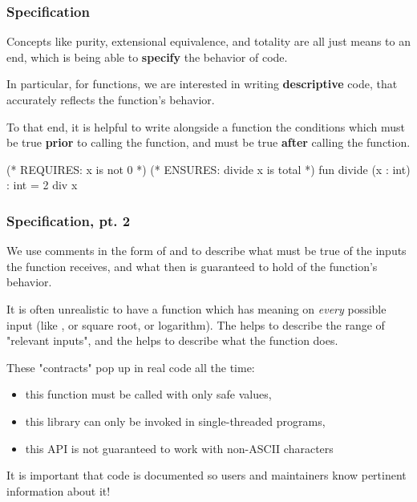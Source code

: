 \documentclass[aspectratio=169]{beamer}
\begin{document}
\begin{frame}[fragile]
  \frametitle{Specification}

  Concepts like purity, extensional equivalence, and totality are all just means to
  an end, which is being able to \textbf{specify} the behavior of code.

  \vspace{\fill}

  In particular, for functions, we are interested in writing \textbf{descriptive} code,
  that accurately reflects the function's behavior.
  
  \vspace{5pt}

  To that end, it is helpful to write alongside a function the conditions which 
  must be true \textbf{prior} to calling the function, and must be true \textbf{after}
  calling the function.

  \vspace{\fill}

  \begin{codeblock}
    (* REQUIRES: x is not 0 *)
    (* ENSURES: divide x is total *)
    fun divide (x : int) : int = 2 div x 
  \end{codeblock}
\end{frame}

\begin{frame}[fragile]
  \frametitle{Specification, pt. 2}

  We use comments in the form of  and  to describe 
  what must be true of the inputs the function receives, and what then is guaranteed 
  to hold of the function's behavior. 

  \vspace{\fill}

  It is often unrealistic to have a function which has meaning on \textit{every} possible 
  input (like , or square root, or logarithm). The  helps to
  describe the range of "relevant inputs", and the  helps to describe
  what the function does.

  \vspace{\fill}

  These "contracts" pop up in real code all the time:
  \begin{itemize}
    \item this function must be called with only safe values,
    \item this library can only be invoked in single-threaded programs,  
    \item this API is not guaranteed to work with non-ASCII characters 
  \end{itemize}

  \vspace{\fill}

  It is important that code is documented so users and maintainers know pertinent
  information about it! 
\end{frame}
\end{document}
